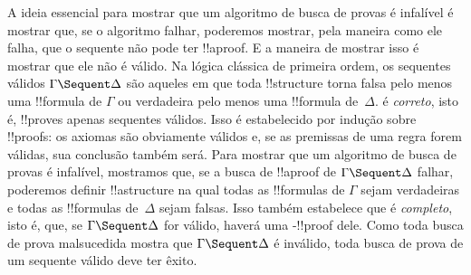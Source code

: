 \documentclass[../../../include/open-logic-section]{subfiles}
\begin{document}
A ideia essencial para mostrar que um algoritmo de busca de provas é
infalível é mostrar que, se o algoritmo falhar, poderemos mostrar, pela
maneira como ele falha, que o sequente não pode ter !!a{proof}. E a
maneira de mostrar isso é mostrar que ele não é válido. Na lógica
clássica de primeira ordem, os sequentes válidos $\Gamma \Sequent
\Delta$ são aqueles em que toda !!{structure} torna falsa pelo menos
uma !!{formula} de $\Gamma$ ou verdadeira pelo menos uma !!{formula}
de~$\Delta$.  é \emph{correto}, isto é, !!{prove}s apenas
sequentes válidos. Isso é estabelecido por indução sobre !!{proof}s: os
axiomas são obviamente válidos e, se as premissas de uma regra forem
válidas, sua conclusão também será. Para mostrar que um algoritmo de
busca de provas é infalível, mostramos que, se a busca de !!a{proof} de
$\Gamma \Sequent \Delta$ falhar, poderemos definir !!a{structure} na
qual todas as !!{formula}s de $\Gamma$ sejam verdadeiras e todas as
!!{formula}s de~$\Delta$ sejam falsas. Isso também estabelece que
 é \emph{completo}, isto é, que, se $\Gamma \Sequent \Delta$
for válido, haverá uma -!!{proof} dele. Como toda busca de
prova malsucedida mostra que $\Gamma \Sequent \Delta$ é inválido, toda
busca de prova de um sequente válido deve ter êxito.
\end{document}
